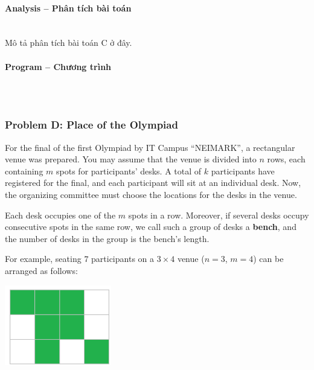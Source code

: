\documentclass{article}
\begin{document}
\paragraph{Analysis -- Phân tích bài toán} \mbox{} \\

Mô tả phân tích bài toán C ở đây.

\paragraph{Program -- Chương trình} \mbox{} \\

\begin{lstlisting}

\end{lstlisting}

\subsubsection{Problem D: Place of the Olympiad}

For the final of the first Olympiad by IT Campus ``NEIMARK'', a rectangular venue was prepared. You may assume that the venue is divided into $n$ rows, each containing $m$ spots for participants' desks. A total of $k$ participants have registered for the final, and each participant will sit at an individual desk. Now, the organizing committee must choose the locations for the desks in the venue.

Each desk occupies one of the $m$ spots in a row. Moreover, if several desks occupy consecutive spots in the same row, we call such a group of desks a \textbf{bench}, and the number of desks in the group is the bench's length.

For example, seating $7$ participants on a $3 \times 4$ venue ($n=3$, $m=4$) can be arranged as follows:\\

\begin{center}
    \includegraphics[width=0.35\textwidth]{Figures/CF_Round1013_D_1.png} 
\end{center}
\end{document}
